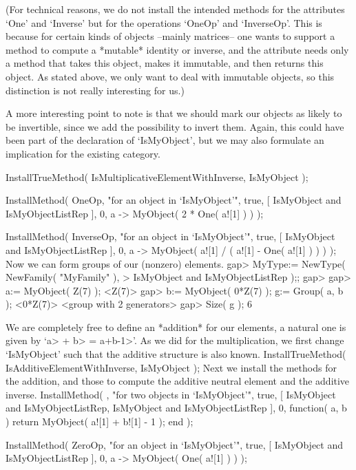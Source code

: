 (For technical reasons, we do not install the intended methods for
the attributes `One' and `Inverse' but for the operations `OneOp'
and `InverseOp'.
This is because for certain kinds of objects --mainly matrices--
one wants to support a method to compute a *mutable* identity or
inverse, and the attribute needs only a method that takes this
object, makes it immutable, and then returns this object.
As stated above, we only want to deal with immutable objects,
so this distinction is not really interesting for us.)

A more interesting point to note is that we should mark our objects
as likely to be invertible,
since we add the possibility to invert them.
Again, this could have been part of the declaration of `IsMyObject',
but we may also formulate an implication for the existing category.

\begintt
InstallTrueMethod( IsMultiplicativeElementWithInverse, IsMyObject );

InstallMethod( OneOp,
    "for an object in `IsMyObject'",
    true,
    [ IsMyObject and IsMyObjectListRep ], 0,
    a -> MyObject( 2 * One( a![1] ) ) );

InstallMethod( InverseOp,
    "for an object in `IsMyObject'",
    true,
    [ IsMyObject and IsMyObjectListRep ], 0,
    a -> MyObject( a![1] / ( a![1] - One( a![1] ) ) ) );
\endtt
Now we can form groups of our (nonzero) elements.
\begintt
gap> MyType:= NewType( NewFamily( "MyFamily" ),
>                   IsMyObject and IsMyObjectListRep );;
gap> 
gap> a:= MyObject( Z(7) );
<Z(7)>
gap> b:= MyObject( 0*Z(7) );  g:= Group( a, b );
<0*Z(7)>
<group with 2 generators>
gap> Size( g );
6
\endtt

We are completely free to define an *addition* for our elements,
a natural one is given by `\<a> + \<b> = \<a+b-1>'.
As we did for the multiplication, we first change `IsMyObject'
such that the additive structure is also known.
\begintt
InstallTrueMethod( IsAdditiveElementWithInverse, IsMyObject );
\endtt
Next we install the methods for the addition,
and those to compute the additive neutral element
and the additive inverse.
\begintt
InstallMethod( \+,
    "for two objects in `IsMyObject'",
    true,
    [ IsMyObject and IsMyObjectListRep,
      IsMyObject and IsMyObjectListRep ], 0,
    function( a, b )
    return MyObject( a![1] + b![1] - 1 );
    end );

InstallMethod( ZeroOp,
    "for an object in `IsMyObject'",
    true,
    [ IsMyObject and IsMyObjectListRep ], 0,
    a -> MyObject( One( a![1] ) ) );

